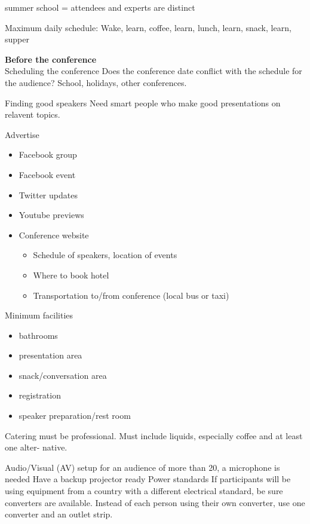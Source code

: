 summer school = attendees and experts are distinct

Maximum daily schedule:
Wake, learn, coffee, learn, lunch, learn, snack, learn, supper

\textbf{Before the conference}\\

Scheduling the conference
Does the conference date conflict with the schedule for the audience? School, holidays, other conferences.

Finding good speakers
Need smart people who make good presentations on relavent topics.

Advertise
\begin{itemize}
\item Facebook group
\item Facebook event
\item Twitter updates
\item Youtube previews
\item Conference website
    \begin{itemize}
      \item Schedule of speakers, location of events
    \item Where to book hotel
    \item Transportation to/from conference (local bus or taxi)
    \end{itemize}
\end{itemize}
Minimum facilities
\begin{itemize}
\item bathrooms
\item presentation area
\item snack/conversation area
\item registration
\item speaker preparation/rest room
\end{itemize}

Catering must be professional. Must include liquids, especially coffee and at least one alter-
native.

Audio/Visual (AV) setup
for an audience of more than 20, a microphone is needed
Have a backup projector ready
Power standards
If participants will be using equipment from a country with a different electrical standard, be sure converters are available. Instead of each person using their own converter, use one converter and an outlet strip.


